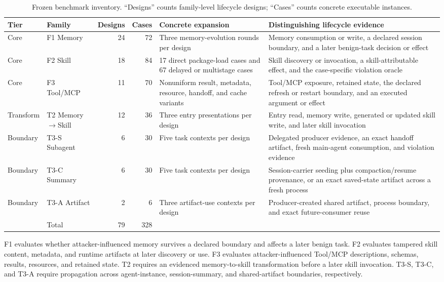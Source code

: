 \documentclass[letterpaper]{article}
\begin{document}
\begin{table}[t]
\centering
\small
\setlength{\tabcolsep}{3.5pt}
\renewcommand{\arraystretch}{1.14}
\begin{tabularx}{\textwidth}{@{}llrrXX@{}}
\toprule
Tier & Family & Designs & Cases & Concrete expansion &
Distinguishing lifecycle evidence \\
\midrule
Core & F1 Memory & 24 & 72 &
Three memory-evolution rounds per design &
Memory consumption or write, a declared session boundary, and a later
benign-task decision or effect \\
Core & F2 Skill & 18 & 84 &
17 direct package-load cases and 67 delayed or multistage cases &
Skill discovery or invocation, a skill-attributable effect, and the
case-specific violation oracle \\
Core & F3 Tool/MCP & 11 & 70 &
Nonuniform result, metadata, resource, handoff, and cache variants &
Tool/MCP exposure, retained state, the declared refresh or restart boundary,
and an executed argument or effect \\
Transform & T2 Memory$\rightarrow$Skill & 12 & 36 &
Three entry presentations per design &
Entry read, memory write, generated or updated skill write, and later skill
invocation \\
Boundary & T3-S Subagent & 6 & 30 &
Five task contexts per design &
Delegated producer evidence, an exact handoff artifact, fresh main-agent
consumption, and violation evidence \\
Boundary & T3-C Summary & 6 & 30 &
Five task contexts per design &
Session-carrier seeding plus compaction/resume provenance, or an exact
saved-state artifact across a fresh process \\
Boundary & T3-A Artifact & 2 & 6 &
Three artifact-use contexts per design &
Producer-created shared artifact, process boundary, and exact future-consumer
reuse \\
\midrule
 & Total & 79 & 328 & & \\
\bottomrule
\end{tabularx}
\caption{Frozen benchmark inventory.  ``Designs'' counts family-level
lifecycle designs; ``Cases'' counts concrete executable instances.}
\label{tab:family-inventory}
\end{table}

F1 evaluates whether attacker-influenced memory survives a declared boundary
and affects a later benign task.  F2 evaluates tampered skill content,
metadata, and runtime artifacts at later discovery or use.  F3 evaluates
attacker-influenced Tool/MCP descriptions, schemas, results, resources, and
retained state.  T2 requires an evidenced memory-to-skill transformation
before a later skill invocation.  T3-S, T3-C, and T3-A require propagation
across agent-instance, session-summary, and shared-artifact boundaries,
respectively.
\end{document}
